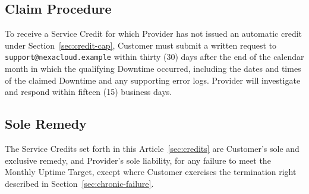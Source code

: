 \subsection{Claim Procedure}
To receive a Service Credit for which Provider has not issued an automatic credit under Section~\ref{sec:credit-cap}, Customer must submit a written request to \texttt{support@nexacloud.example} within thirty (30) days after the end of the calendar month in which the qualifying Downtime occurred, including the dates and times of the claimed Downtime and any supporting error logs. Provider will investigate and respond within fifteen (15) business days.

\subsection{Sole Remedy}
The Service Credits set forth in this Article~\ref{sec:credits} are Customer's sole and exclusive remedy, and Provider's sole liability, for any failure to meet the Monthly Uptime Target, except where Customer exercises the termination right described in Section~\ref{sec:chronic-failure}.
